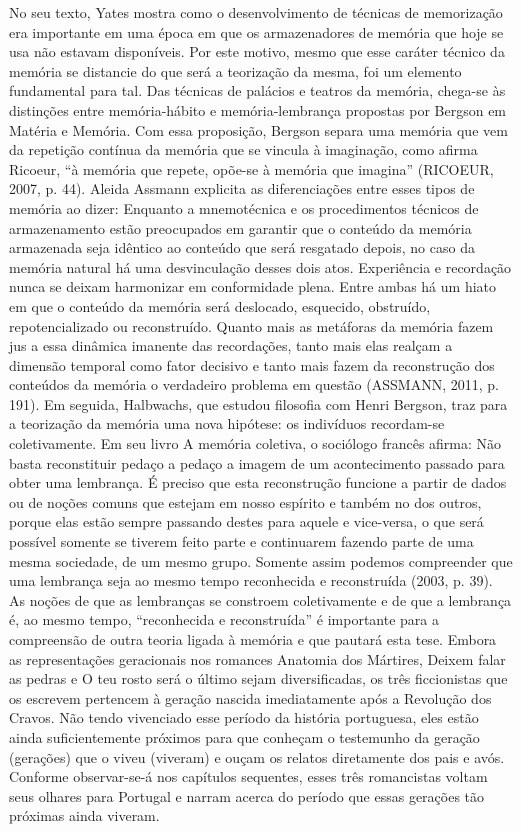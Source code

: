 \documentclass[../DISSERTACAO_MAIN.tex]{subfiles}
\begin{document}
No seu texto, Yates mostra como o desenvolvimento de técnicas de memorização era importante em uma época em que os armazenadores de memória que hoje se usa não estavam disponíveis. Por este motivo, mesmo que esse caráter técnico da memória se distancie do que será a teorização da mesma, foi um elemento fundamental para tal. Das técnicas de palácios e teatros da memória, chega-se às distinções entre memória-hábito e memória-lembrança propostas por Bergson em Matéria e Memória. Com essa proposição, Bergson separa uma memória que vem da repetição contínua da memória que se vincula à imaginação, como afirma Ricoeur, “à memória que repete, opõe-se à memória que imagina” (RICOEUR, 2007, p. 44). Aleida Assmann explicita as diferenciações entre esses tipos de memória ao dizer:
Enquanto a mnemotécnica e os procedimentos técnicos de armazenamento estão preocupados em garantir que o conteúdo da memória armazenada seja idêntico ao conteúdo que será resgatado depois, no caso da memória natural há uma desvinculação desses dois atos. Experiência e recordação nunca se deixam harmonizar em conformidade plena. Entre ambas há um hiato em que o conteúdo da memória será deslocado, esquecido, obstruído, repotencializado ou reconstruído. Quanto mais as metáforas da memória fazem jus a essa dinâmica imanente das recordações, tanto mais elas realçam a dimensão temporal como fator decisivo e tanto mais fazem da reconstrução dos conteúdos da memória o verdadeiro problema em questão (ASSMANN, 2011, p. 191).
Em seguida, Halbwachs, que estudou filosofia com Henri Bergson, traz para a teorização da memória uma nova hipótese: os indivíduos recordam-se coletivamente. Em seu livro A memória coletiva, o sociólogo francês afirma:
Não basta reconstituir pedaço a pedaço a imagem de um acontecimento passado para obter uma lembrança. É preciso que esta reconstrução funcione a partir de dados ou de noções comuns que estejam em nosso espírito e também no dos outros, porque elas estão sempre passando destes para aquele e vice-versa, o que será possível somente se tiverem feito parte e continuarem  fazendo parte de uma mesma sociedade, de um mesmo grupo. Somente assim podemos compreender que uma lembrança seja ao mesmo tempo reconhecida e reconstruída (2003, p. 39).
As noções de que as lembranças se constroem coletivamente e de que a lembrança é, ao mesmo tempo, “reconhecida e reconstruída” é importante para a compreensão de outra teoria ligada à memória e que pautará esta tese. Embora as representações geracionais nos romances Anatomia dos Mártires, Deixem falar as pedras e O teu rosto será o último sejam diversificadas, os três ficcionistas que os escrevem pertencem à geração nascida imediatamente após a Revolução dos Cravos. Não tendo vivenciado esse período da história portuguesa, eles estão ainda suficientemente próximos para que conheçam o testemunho da geração (gerações) que o viveu (viveram) e ouçam os relatos diretamente dos pais e avós. Conforme observar-se-á nos capítulos sequentes, esses três romancistas voltam seus olhares para Portugal e narram acerca do período que essas gerações tão próximas ainda viveram.
\end{document}
